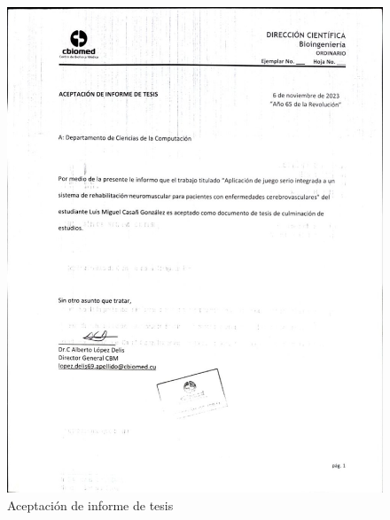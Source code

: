 \begin{annexes}
    \begin{figure}[ht]
        \centering
        \includegraphics[width=\textwidth, height=0.98\textheight]{images/annexes/aval-cbm.jpg}
        \caption{Aceptación de informe de tesis}
        \label{annex: endorsedby}
    \end{figure}


\end{annexes}

